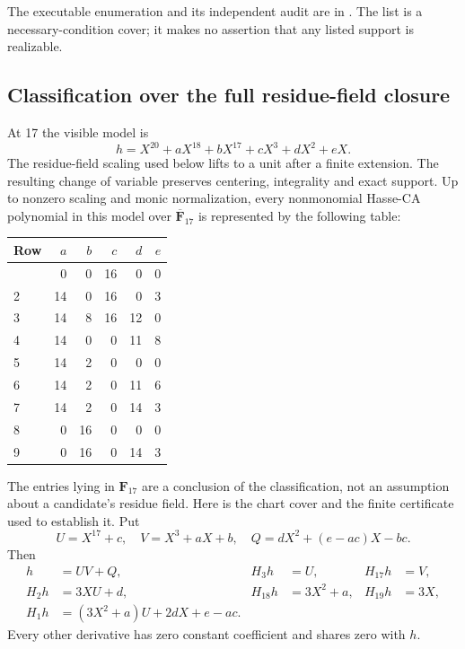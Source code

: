 \documentclass[
  british,
  10pt,
  a4paper,
]{article}
\newcounter{none} %
\begin{document}
The executable enumeration and its independent audit are in
. The list is a necessary-condition
cover; it makes no assertion that any listed support is realizable.

\subsection{Classification over the full residue-field
closure}\label{classification-over-the-full-residue-field-closure}

At 17 the visible model is \[
 h=X^{20}+aX^{18}+bX^{17}+cX^3+dX^2+eX.
\] The residue-field scaling used below lifts to a unit after a finite
extension. The resulting change of variable preserves centering,
integrality and exact support. Up to nonzero scaling and monic
normalization, every nonmonomial Hasse-CA polynomial in this model over
\(\overline{\mathbf F}_{17}\) is represented by the following table:

{\def\LTcaptype{none} %
\begin{longtable}[]{@{}lrrrrr@{}}
\toprule\noalign{}
Row & \(a\) & \(b\) & \(c\) & \(d\) & \(e\) \\
\midrule\noalign{}
\endhead
\bottomrule\noalign{}
\endlastfoot
1 & 0 & 0 & 16 & 0 & 0 \\
2 & 14 & 0 & 16 & 0 & 3 \\
3 & 14 & 8 & 16 & 12 & 0 \\
4 & 14 & 0 & 0 & 11 & 8 \\
5 & 14 & 2 & 0 & 0 & 0 \\
6 & 14 & 2 & 0 & 11 & 6 \\
7 & 14 & 2 & 0 & 14 & 3 \\
8 & 0 & 16 & 0 & 0 & 0 \\
9 & 0 & 16 & 0 & 14 & 3 \\
\end{longtable}
}

The entries lying in \(\mathbf F_{17}\) are a conclusion of the
classification, not an assumption about a candidate's residue field.
Here is the chart cover and the finite certificate used to establish it.
Put \[
 U=X^{17}+c,\quad V=X^3+aX+b,\quad
 Q=dX^2+(e-ac)X-bc.
\] Then \[
\begin{aligned}
h&=UV+Q,& H_3h&=U,&H_{17}h&=V,\\
H_2h&=3XU+d,&H_{18}h&=3X^2+a,&H_{19}h&=3X,\\
H_1h&=(3X^2+a)U+2dX+e-ac.
\end{aligned}
\] Every other derivative has zero constant coefficient and shares zero
with \(h\).
\end{document}
